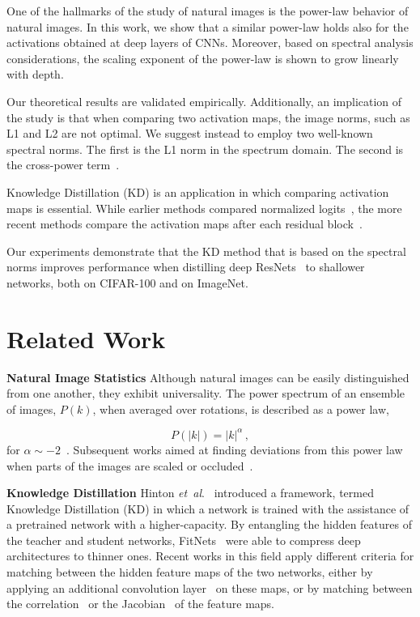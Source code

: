 \documentclass{article}
\def\etal{\emph{et~al}.}
\begin{document}
One of the hallmarks of the study of natural images is the power-law behavior of natural images. In this work, we show that a similar power-law holds also for the activations obtained at deep layers of CNNs. Moreover, based on spectral analysis considerations, the scaling exponent of the power-law is shown to grow linearly with depth.

Our theoretical results are validated empirically. Additionally, an implication of the study is that when comparing two activation maps, the image norms, such as L1 and L2 are not optimal. We suggest instead to employ two well-known spectral norms. The first is the L1 norm in the spectrum domain. The second is the cross-power term~\cite{rabiner1975theory}.

Knowledge Distillation (KD) is an application in which comparing activation maps is essential. While earlier methods compared normalized logits~\cite{hinton2015distilling}, the more recent methods compare the activation maps after each residual block~\cite{heo2019comprehensive}.

Our experiments demonstrate that the KD method that is based on the spectral norms improves performance when distilling deep ResNets~\cite{he2016deep} to shallower networks, both on CIFAR-100 and on ImageNet.

\section{Related Work}

{\bf Natural Image Statistics\quad} Although natural images can be easily distinguished from one another, they exhibit universality. The power spectrum of an ensemble of images, $P\left( k \right)$, when averaged over rotations, is described as a power law,

\begin{equation}
P\left(\left \vert  k \right \vert \right)  = \left \vert  k \right \vert ^{\alpha} \,,
\label{eq:powerlaw}
\end{equation}
for $\alpha \sim -2$~\cite{field1987relations,tolhurst1992amplitude,ruderman1997origins}. Subsequent works aimed at finding deviations from this power law when parts of the images are scaled or occluded~\cite{millane2003scaling}.

\smallskip
{\bf Knowledge Distillation\quad}
Hinton \etal~\cite{hinton2015distilling} introduced a framework, termed Knowledge Distillation (KD) in which a network is trained with the assistance of a pretrained network with a higher-capacity. By entangling the hidden features of the teacher and student networks, FitNets~\cite{romero2014fitnets} were able to compress deep architectures to thinner ones. Recent works in this field apply different criteria for matching between the hidden feature maps of the two networks, either by applying an additional convolution layer~\cite{heo2019comprehensive,romero2014fitnets} on these maps, or by matching between the correlation~\cite{yim2017gift} or the Jacobian~\cite{srinivas2018knowledge} of the feature maps.
\end{document}
